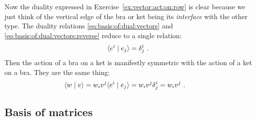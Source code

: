 \documentclass[12pt, oneside]{report}    %
\begin{document}
Now the duality expressed in Exercise~\ref{ex:vector:act:on:row} is clear because we just think of the vertical edge of the bra or ket being its \emph{interface} with the other type. The duality relations \eqref{eq:basis:of:dual:vectors} and \eqref{eq:basis:of:dual:vectors:reverse} reduce to a single relation:
\begin{align}
    \langle e^i \mid e_j \rangle = \delta^i_j \ .
\end{align}
Then the action of a bra on a ket is manifestly symmetric with the action of a ket on a bra. They are the same thing:
\begin{align}
    \langle w \mid v \rangle &= w_iv^j \langle e^i \mid e_j \rangle  = w_i v^j \delta^i_j = w_iv^j \ .
    \label{eq:basis:of:dual:vectors:bra:ket:form}
\end{align}

\subsection{Basis of matrices}
\end{document}
